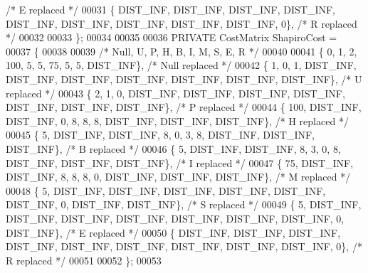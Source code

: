 \begin{DoxyCode}
       \textcolor{comment}{/* E    replaced */}
00031    \{ DIST\_INF, DIST\_INF, DIST\_INF, DIST\_INF, DIST\_INF, DIST\_INF, DIST\_INF, DIST\_INF, DIST\_INF,        0\},  
       \textcolor{comment}{/* R    replaced */}
00032 
00033 \};
00034 
00035 
00036 PRIVATE CostMatrix ShapiroCost =
00037 \{
00038 
00039 \textcolor{comment}{/*    Null,       U,        P,        H,        B,        I,        M,        S,        E,        R     */}
00040 
00041    \{        0,        1,        2,      100,        5,        5,       75,        5,        5, DIST\_INF\},  
       \textcolor{comment}{/* Null replaced */}
00042    \{        1,        0,        1, DIST\_INF, DIST\_INF, DIST\_INF, DIST\_INF, DIST\_INF, DIST\_INF, DIST\_INF\},  
       \textcolor{comment}{/* U    replaced */}
00043    \{        2,        1,        0, DIST\_INF, DIST\_INF, DIST\_INF, DIST\_INF, DIST\_INF, DIST\_INF, DIST\_INF\},  
       \textcolor{comment}{/* P    replaced */}
00044    \{      100, DIST\_INF, DIST\_INF,        0,        8,        8,        8, DIST\_INF, DIST\_INF, DIST\_INF\},  
       \textcolor{comment}{/* H    replaced */}
00045    \{        5, DIST\_INF, DIST\_INF,        8,        0,        3,        8, DIST\_INF, DIST\_INF, DIST\_INF\},  
       \textcolor{comment}{/* B    replaced */}
00046    \{        5, DIST\_INF, DIST\_INF,        8,        3,        0,        8, DIST\_INF, DIST\_INF, DIST\_INF\},  
       \textcolor{comment}{/* I    replaced */}
00047    \{       75, DIST\_INF, DIST\_INF,        8,        8,        8,        0, DIST\_INF, DIST\_INF, DIST\_INF\},  
       \textcolor{comment}{/* M    replaced */}
00048    \{        5, DIST\_INF, DIST\_INF, DIST\_INF, DIST\_INF, DIST\_INF, DIST\_INF,        0, DIST\_INF, DIST\_INF\},  
       \textcolor{comment}{/* S    replaced */}
00049    \{        5, DIST\_INF, DIST\_INF, DIST\_INF, DIST\_INF, DIST\_INF, DIST\_INF, DIST\_INF,        0, DIST\_INF\},  
       \textcolor{comment}{/* E    replaced */}
00050    \{ DIST\_INF, DIST\_INF, DIST\_INF, DIST\_INF, DIST\_INF, DIST\_INF, DIST\_INF, DIST\_INF, DIST\_INF,        0\},  
       \textcolor{comment}{/* R    replaced */}
00051 
00052 \};
00053 
\end{DoxyCode}
